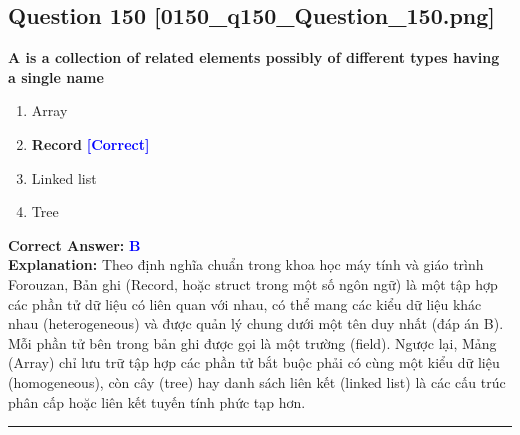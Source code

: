 \documentclass[11pt,a4paper]{article}
\begin{document}
\begin{minipage}{\textwidth}
\subsection*{Question 150 \quad \footnotesize{[0150\_q150\_Question\_150.png]}}
\noindent \textbf{A is a collection of related elements possibly of different types having a single name}

\begin{enumerate}[label=\Alph*.]
    \item Array
    \item \textbf{Record} \hfill \textcolor{blue}{\textbf{[Correct]}}
    \item Linked list
    \item Tree
\end{enumerate}

\noindent \textbf{Correct Answer:} \textcolor{blue}{\textbf{B}} \\[2pt]
\noindent \textbf{Explanation:} Theo định nghĩa chuẩn trong khoa học máy tính và giáo trình Forouzan, Bản ghi (Record, hoặc struct trong một số ngôn ngữ) là một tập hợp các phần tử dữ liệu có liên quan với nhau, có thể mang các kiểu dữ liệu khác nhau (heterogeneous) và được quản lý chung dưới một tên duy nhất (đáp án B). Mỗi phần tử bên trong bản ghi được gọi là một trường (field). Ngược lại, Mảng (Array) chỉ lưu trữ tập hợp các phần tử bắt buộc phải có cùng một kiểu dữ liệu (homogeneous), còn cây (tree) hay danh sách liên kết (linked list) là các cấu trúc phân cấp hoặc liên kết tuyến tính phức tạp hơn.

\par\vspace{0.3cm}
\hrule
\vspace{0.3cm}
\end{minipage}
\end{document}
